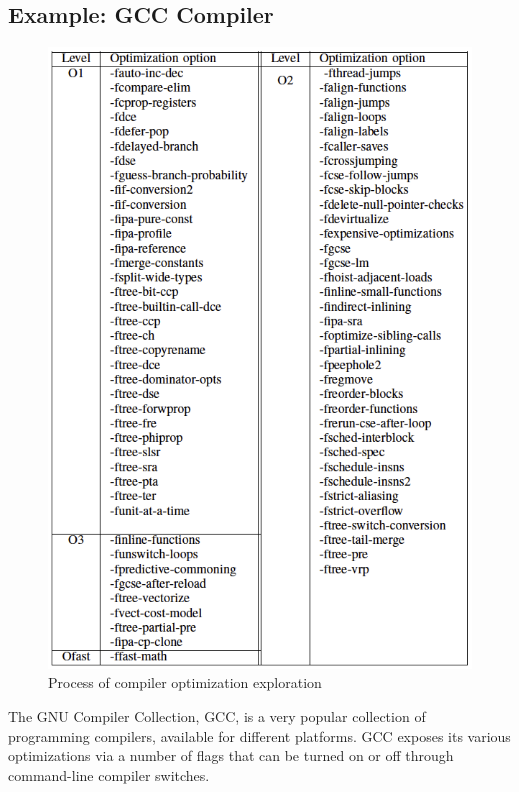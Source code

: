 \subsection{Example: GCC Compiler}
\begin{figure}[!htbp]
	\centering
	\includegraphics[width=0.9\linewidth]{chapitre3/fig/optimizations.png}
	\caption{Process of compiler optimization exploration}
	
\end{figure}
The GNU Compiler Collection, GCC, is a very popular collection of programming compilers, available for different platforms.
GCC exposes its various optimizations via a number of flags that can be turned on or off through command-line compiler switches. 

